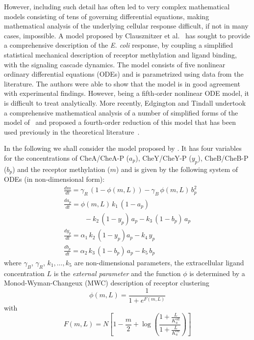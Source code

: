 \documentclass[a4paper,fleqn]{cas-dc}
\newcommand{\etal}{\textrm{et al.}}
\begin{document}
However, including such detail has often led to very complex mathematical models consisting of tens of governing differential equations, making mathematical analysis of the underlying cellular response difficult, if not in many cases, impossible. 
A model proposed by Clausznitzer \etal~\cite{clausznitzer2010} has sought to provide a comprehensive description of the \textit{E. coli} response, by coupling a simplified statistical mechanical description of receptor methylation and ligand binding, with the signaling cascade dynamics. 
The model consists of five nonlinear ordinary differential equations (ODEs) and is parametrized using data from the literature. The authors were able to show that the model is in good agreement with experimental findings. 
However, being a fifth-order nonlinear ODE model, it is difficult to treat analytically. 
More recently, Edgington and Tindall \cite{edgington2018} undertook a comprehensive mathematical analysis of a number of simplified forms of the model of~\cite{clausznitzer2010} and proposed a fourth-order reduction of this model that has been used previously in the theoretical literature~\cite{edgington2015}.

In the following we shall consider the model proposed by \cite{edgington2015,edgington2018}. 
It has four variables for the concentrations of CheA/CheA-P ($a_p$), CheY/CheY-P ($y_p$), CheB/CheB-P ($b_p$) and the receptor methylation ($m$) and is given by the following system of ODEs (in non-dimensional form):
\begin{equation} \label{original_e_coli}
\begin{aligned}
& \frac{d m}{d t} = \gamma_{R}\, (1 - \phi(m,L)) - \gamma_{B} \, \phi(m,L) \, b_{p}^{2} \\
& \frac{d a_{p}}{d t} = \phi(m,L) \, k_{1} \, (1 - a_{p}) \\
& \qquad\quad - k_{2} \, (1 - y_{p})\, a_{p} - k_{3} \, (1 - b_{p}) \, a_{p} \\
& \frac{d y_{p}}{d t} = \alpha_{1} \, k_{2} \, (1 - y_{p})a_{p} - k_{4} \, y_{p} \\
& \frac{d b_{p}}{d t} = \alpha_{2} \, k_{3} \, (1 - b_{p}) \, a_{p} - k_{5} \, b_{p}
\end{aligned}
\end{equation}
where $\gamma_B$, $\gamma_R$, $k_1,\ldots,k_5$ are non-dimensional parameters, the extracellular ligand concentration $L$ is the \emph{external parameter} and the function $\phi$ is determined by a Monod\--Wyman\--Changeux (MWC) description of receptor clustering
\begin{equation} \label{definition_phi}
    \phi (m,L) = \frac{1}{1 + e^{F(m,L)}} 
\end{equation}
with
\begin{equation} \label{definition_F}
    F(m,L) = N\left[ 1 - \frac{m}{2} + \log \left( \frac{1 + \frac{L}{K_{a}^{\textrm{off}}}}{1 + \frac{L}{K_{a}^{\textrm{on}}}}\right) \right]
\end{equation}
\end{document}
